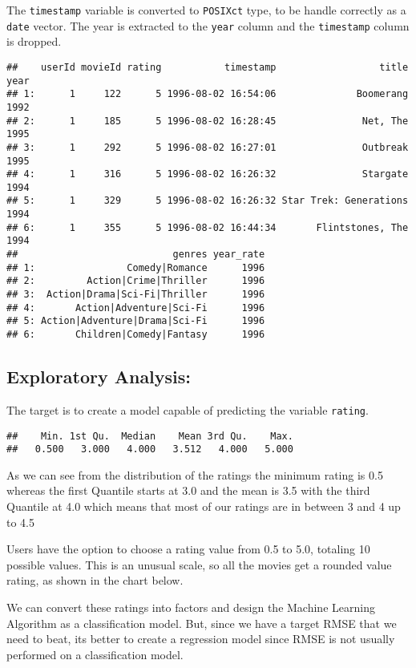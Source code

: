\documentclass[
]{article}
\begin{document}
The \texttt{timestamp} variable is converted to \texttt{POSIXct} type,
to be handle correctly as a \texttt{date} vector. The year is extracted
to the \texttt{year} column and the \texttt{timestamp} column is
dropped.

\begin{verbatim}
##    userId movieId rating           timestamp                  title year
## 1:      1     122      5 1996-08-02 16:54:06              Boomerang 1992
## 2:      1     185      5 1996-08-02 16:28:45               Net, The 1995
## 3:      1     292      5 1996-08-02 16:27:01               Outbreak 1995
## 4:      1     316      5 1996-08-02 16:26:32               Stargate 1994
## 5:      1     329      5 1996-08-02 16:26:32 Star Trek: Generations 1994
## 6:      1     355      5 1996-08-02 16:44:34       Flintstones, The 1994
##                           genres year_rate
## 1:                Comedy|Romance      1996
## 2:         Action|Crime|Thriller      1996
## 3:  Action|Drama|Sci-Fi|Thriller      1996
## 4:       Action|Adventure|Sci-Fi      1996
## 5: Action|Adventure|Drama|Sci-Fi      1996
## 6:       Children|Comedy|Fantasy      1996
\end{verbatim}

\hypertarget{exploratory-analysis}{%
\subsection{\texorpdfstring{\textbf{Exploratory
Analysis:}}{Exploratory Analysis:}}\label{exploratory-analysis}}

The target is to create a model capable of predicting the variable
\texttt{rating}.

\begin{verbatim}
##    Min. 1st Qu.  Median    Mean 3rd Qu.    Max. 
##   0.500   3.000   4.000   3.512   4.000   5.000
\end{verbatim}

As we can see from the distribution of the ratings the minimum rating is
0.5 whereas the first Quantile starts at 3.0 and the mean is 3.5 with
the third Quantile at 4.0 which means that most of our ratings are in
between 3 and 4 up to 4.5

Users have the option to choose a rating value from 0.5 to 5.0, totaling
10 possible values. This is an unusual scale, so all the movies get a
rounded value rating, as shown in the chart below.

We can convert these ratings into factors and design the Machine
Learning Algorithm as a classification model. But, since we have a
target RMSE that we need to beat, its better to create a regression
model since RMSE is not usually performed on a classification model.
\end{document}
